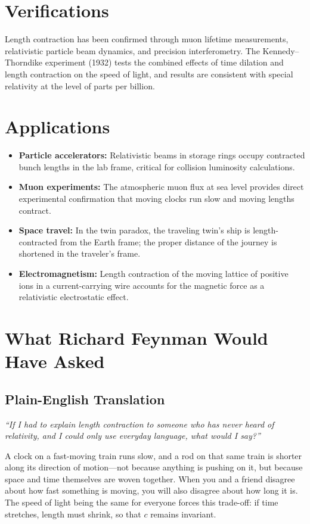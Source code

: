 \documentclass[11pt,openright]{book}
\begin{document}
\section*{Verifications}

Length contraction has been confirmed through muon lifetime measurements, relativistic particle beam dynamics, and precision interferometry. The Kennedy--Thorndike experiment (1932) tests the combined effects of time dilation and length contraction on the speed of light, and results are consistent with special relativity at the level of parts per billion.
\section*{Applications}

\begin{itemize}
  \item \textbf{Particle accelerators:} Relativistic beams in storage rings occupy contracted bunch lengths in the lab frame, critical for collision luminosity calculations.
  \item \textbf{Muon experiments:} The atmospheric muon flux at sea level provides direct experimental confirmation that moving clocks run slow and moving lengths contract.
  \item \textbf{Space travel:} In the twin paradox, the traveling twin's ship is length-contracted from the Earth frame; the proper distance of the journey is shortened in the traveler's frame.
  \item \textbf{Electromagnetism:} Length contraction of the moving lattice of positive ions in a current-carrying wire accounts for the magnetic force as a relativistic electrostatic effect.
\end{itemize}
\section*{What Richard Feynman Would Have Asked}

\subsection*{Plain-English Translation}
\textit{``If I had to explain length contraction to someone who has never heard of relativity, and I could only use everyday language, what would I say?''}

A clock on a fast-moving train runs slow, and a rod on that same train is shorter along its direction of motion---not because anything is pushing on it, but because space and time themselves are woven together. When you and a friend disagree about how fast something is moving, you will also disagree about how long it is. The speed of light being the same for everyone forces this trade-off: if time stretches, length must shrink, so that $c$ remains invariant.
\end{document}
